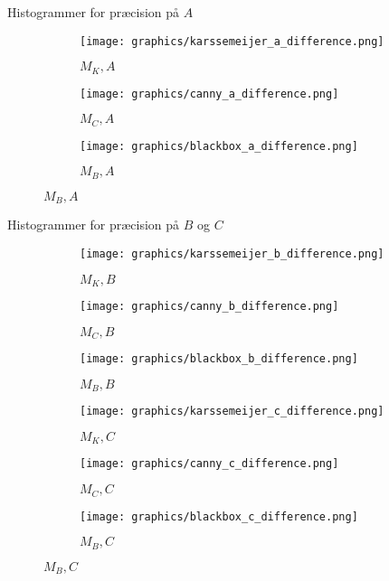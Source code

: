 \begin{frame}{Histogrammer for præcision på $A$}
	\begin{figure}
		\begin{subfigure}{0.32\linewidth}
			\texttt{[image: graphics/karssemeijer\_a\_difference.png]}
			\caption{$M_K, A$}
		\end{subfigure}
		\begin{subfigure}{0.32\linewidth}
			\texttt{[image: graphics/canny\_a\_difference.png]}
			\caption{$M_C, A$}
		\end{subfigure}
		\begin{subfigure}{0.32\linewidth}
			\texttt{[image: graphics/blackbox\_a\_difference.png]}
			\caption{$M_B, A$}
		\end{subfigure}
	\end{figure}
\end{frame}

\begin{frame}{Histogrammer for præcision på $B$ og $C$}
	\begin{figure}
		\begin{subfigure}{0.32\linewidth}
			\texttt{[image: graphics/karssemeijer\_b\_difference.png]}
			\caption{$M_K, B$}
		\end{subfigure}
		\begin{subfigure}{0.32\linewidth}
			\texttt{[image: graphics/canny\_b\_difference.png]}
			\caption{$M_C, B$}
		\end{subfigure}
		\begin{subfigure}{0.32\linewidth}
			\texttt{[image: graphics/blackbox\_b\_difference.png]}
			\caption{$M_B, B$}
		\end{subfigure}
		\begin{subfigure}{0.32\linewidth}
			\texttt{[image: graphics/karssemeijer\_c\_difference.png]}
			\caption{$M_K, C$}
		\end{subfigure}
		\begin{subfigure}{0.32\linewidth}
			\texttt{[image: graphics/canny\_c\_difference.png]}
			\caption{$M_C, C$}
		\end{subfigure}
		\begin{subfigure}{0.32\linewidth}
			\texttt{[image: graphics/blackbox\_c\_difference.png]}
			\caption{$M_B, C$}
		\end{subfigure}
	\end{figure}
\end{frame}

